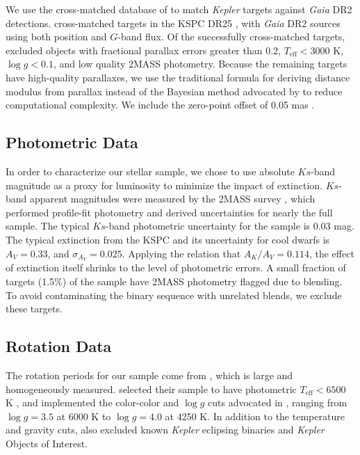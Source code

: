 \documentclass[twocolumn]{aastex6}
\newcommand{\Kepler}{\mbox{\textit{Kepler}}}
\newcommand{\Gaia}{\mbox{\textit{Gaia}}}
\newcommand{\Teff}{\ensuremath{T_{\textrm{eff}}}}
\newcommand{\logg}{\ensuremath{\log g}}
\begin{document}
We use the cross-matched database of \citet{Berger18b} to match \Kepler{} targets
against \Gaia{} DR2 detections.
\citet{Berger18b} cross-matched targets in the KSPC DR25 \citep{Mathur17}, 
with \Gaia{} DR2 sources using both position and \(G\)-band flux. Of the 
successfully cross-matched targets, \citet{Berger18b} excluded objects with 
fractional parallax errors greater than 0.2, \(\Teff < 3000\) K, 
\(\logg < 0.1\), and low quality 2MASS photometry.  Because the remaining
targets have high-quality parallaxes, we use the traditional 
formula for deriving distance modulus from parallax instead of the Bayesian 
method advocated by \citet{Luri18} to reduce computational complexity. We
include the zero-point offset of 0.05 mas \citep{Zinn18}.

\subsection{Photometric Data}

In order to characterize our stellar sample, we chose to use absolute 
\(Ks\)-band magnitude as a proxy for luminosity to minimize the impact of 
extinction.  \(Ks\)-band apparent magnitudes were measured by the 2MASS survey 
\citep{Skrutskie06}, which performed profile-fit photometry and derived 
uncertainties for nearly the full sample.  The typical \(Ks\)-band 
photometric uncertainty for the \citet{McQuillan14} sample is 0.03 mag. The 
typical extinction from the KSPC and its uncertainty for cool dwarfs is 
\(A_V = 0.33\), and \(\sigma_{A_V}=0.025\). Applying the \citet{Cardelli89} 
relation that \(A_K/A_V = 0.114\), the effect of extinction itself shrinks to 
the level of photometric errors.  A small fraction of targets (1.5\%) of the 
\citet{McQuillan14} sample have 2MASS photometry flagged due to blending. To 
avoid contaminating the binary sequence with unrelated blends, we exclude 
these targets.

\subsection{Rotation Data}

The rotation periods for our sample come from \citet{McQuillan14}, which
is large and homogeneously measured. \citet{McQuillan14} selected their sample 
to have photometric \(\Teff < 6500\) K \citep{Brown11,Dressing13}, and 
implemented the color-color and \logg{} cuts advocated in \citet{Ciardi11}, 
ranging from \(\logg = 3.5\) at 6000 K to \(\logg = 4.0\) at 4250 K. 
In addition to the temperature and gravity cuts, \citet{McQuillan14} also 
excluded known \Kepler{} eclipsing binaries and \Kepler{} Objects of Interest. 
\end{document}
